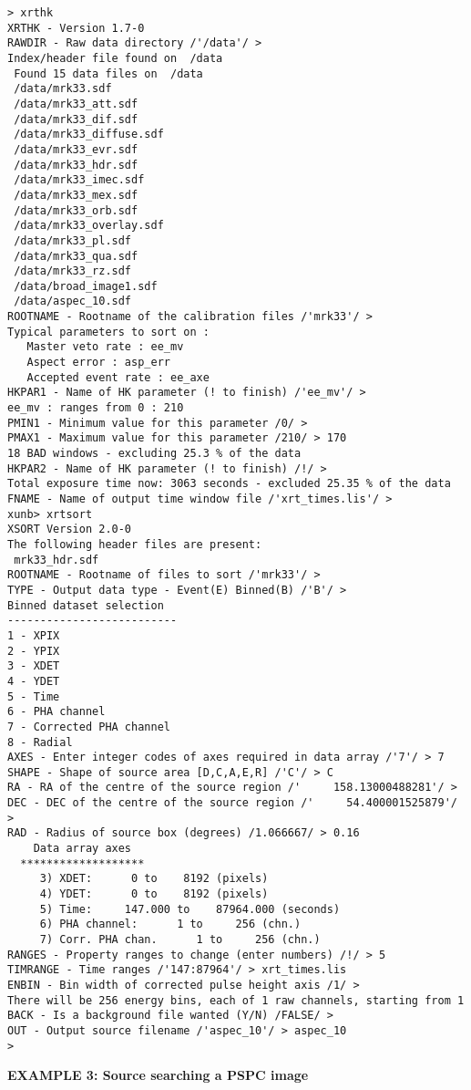 \begin{verbatim}
> xrthk
XRTHK - Version 1.7-0
RAWDIR - Raw data directory /'/data'/ > 
Index/header file found on  /data
 Found 15 data files on  /data
 /data/mrk33.sdf
 /data/mrk33_att.sdf
 /data/mrk33_dif.sdf
 /data/mrk33_diffuse.sdf
 /data/mrk33_evr.sdf
 /data/mrk33_hdr.sdf
 /data/mrk33_imec.sdf
 /data/mrk33_mex.sdf
 /data/mrk33_orb.sdf
 /data/mrk33_overlay.sdf
 /data/mrk33_pl.sdf
 /data/mrk33_qua.sdf
 /data/mrk33_rz.sdf
 /data/broad_image1.sdf
 /data/aspec_10.sdf
ROOTNAME - Rootname of the calibration files /'mrk33'/ > 
Typical parameters to sort on :
   Master veto rate : ee_mv
   Aspect error : asp_err
   Accepted event rate : ee_axe
HKPAR1 - Name of HK parameter (! to finish) /'ee_mv'/ > 
ee_mv : ranges from 0 : 210
PMIN1 - Minimum value for this parameter /0/ > 
PMAX1 - Maximum value for this parameter /210/ > 170
18 BAD windows - excluding 25.3 % of the data
HKPAR2 - Name of HK parameter (! to finish) /!/ > 
Total exposure time now: 3063 seconds - excluded 25.35 % of the data
FNAME - Name of output time window file /'xrt_times.lis'/ > 
xunb> xrtsort
XSORT Version 2.0-0
The following header files are present:
 mrk33_hdr.sdf
ROOTNAME - Rootname of files to sort /'mrk33'/ > 
TYPE - Output data type - Event(E) Binned(B) /'B'/ > 
Binned dataset selection
--------------------------
1 - XPIX
2 - YPIX
3 - XDET
4 - YDET
5 - Time
6 - PHA channel
7 - Corrected PHA channel
8 - Radial
AXES - Enter integer codes of axes required in data array /'7'/ > 7
SHAPE - Shape of source area [D,C,A,E,R] /'C'/ > C
RA - RA of the centre of the source region /'     158.13000488281'/ > 
DEC - DEC of the centre of the source region /'     54.400001525879'/ > 
RAD - Radius of source box (degrees) /1.066667/ > 0.16
    Data array axes
  *******************
     3) XDET:      0 to    8192 (pixels)
     4) YDET:      0 to    8192 (pixels)
     5) Time:     147.000 to    87964.000 (seconds)
     6) PHA channel:      1 to     256 (chn.)
     7) Corr. PHA chan.      1 to     256 (chn.)
RANGES - Property ranges to change (enter numbers) /!/ > 5
TIMRANGE - Time ranges /'147:87964'/ > xrt_times.lis
ENBIN - Bin width of corrected pulse height axis /1/ > 
There will be 256 energy bins, each of 1 raw channels, starting from 1
BACK - Is a background file wanted (Y/N) /FALSE/ > 
OUT - Output source filename /'aspec_10'/ > aspec_10
> 
\end{verbatim}

\newpage
{\bf EXAMPLE 3: Source searching a PSPC image}

